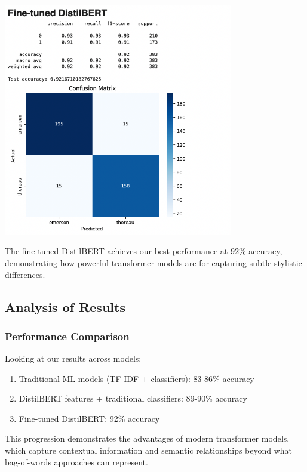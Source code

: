 \documentclass[
]{article}
\begin{document}
\includegraphics[width=0.75\textwidth]{fine_tuned_dbert_confusion.png}

The fine-tuned DistilBERT achieves our best performance at 92\%
accuracy, demonstrating how powerful transformer models are for
capturing subtle stylistic differences.

\subsection{Analysis of Results}\label{analysis-of-results}

\subsubsection{Performance Comparison}\label{performance-comparison}

Looking at our results across models:

\begin{enumerate}
\def\labelenumi{\arabic{enumi}.}
\item
  Traditional ML models (TF-IDF + classifiers): 83-86\% accuracy
\item
  DistilBERT features + traditional classifiers: 89-90\% accuracy
\item
  Fine-tuned DistilBERT: 92\% accuracy
\end{enumerate}

This progression demonstrates the advantages of modern transformer
models, which capture contextual information and semantic relationships
beyond what bag-of-words approaches can represent.
\end{document}
